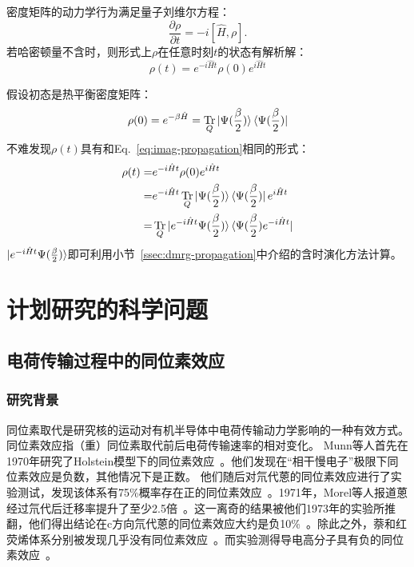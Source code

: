 \documentclass{article}
\DeclareMathOperator{\Tr}{Tr}
\begin{document}
密度矩阵的动力学行为满足量子刘维尔方程：
\begin{equation}
    \frac{\partial \rho}{\partial t} = -i[\hat H, \rho].
\end{equation}
若哈密顿量不含时，则形式上$\rho$在任意时刻$t$的状态有解析解：
\begin{equation}
    \rho(t) = e^{-i \hat H t} \rho(0) e^{i \hat H t}
\end{equation}

假设初态是热平衡密度矩阵：
\begin{equation}
    \rho(0) = e^{- \beta \hat H} = \Tr_Q \ket{\Psi(\frac{\beta}{2})} \bra{\Psi(\frac{\beta}{2})}
\end{equation}
不难发现$\rho(t)$具有和Eq.~\ref{eq:imag-propagation}相同的形式：
\begin{equation}
\begin{aligned}
    \rho(t) = & e^{-i \hat H t} \rho(0) e^{i \hat H t} \\
            = & e^{-i \hat H t} \Tr_Q \ket{\Psi(\frac{\beta}{2})} \bra{\Psi(\frac{\beta}{2})} e^{i \hat H t} \\
            = & \Tr_Q \ket{e^{-i \hat H t} \Psi(\frac{\beta}{2})} \bra{\Psi(\frac{\beta}{2}) e^{-i \hat H t}}
\end{aligned}
\end{equation}
$\ket{e^{-i \hat H t} \Psi(\frac{\beta}{2})}$即可利用小节~\ref{ssec:dmrg-propagation}中介绍的含时演化方法计算。

\section{计划研究的科学问题}
\subsection{电荷传输过程中的同位素效应}
\subsubsection{研究背景}
同位素取代是研究核的运动对有机半导体中电荷传输动力学影响的一种有效方式。同位素效应指（重）同位素取代前后电荷传输速率的相对变化。
Munn等人首先在1970年研究了Holstein模型下的同位素效应~\cite{Munn70}。他们发现在“相干慢电子”极限下同位素效应是负数，其他情况下是正数。
他们随后对氘代蒽的同位素效应进行了实验测试，发现该体系有75\%概率存在正的同位素效应~\cite{Munn70exp}。1971年，Morel等人报道蒽经过氘代后迁移率提升了至少2.5倍~\cite{Morel71}。这一离奇的结果被他们1973年的实验所推翻，他们得出结论在c方向氘代蒽的同位素效应大约是负10\%~\cite{Morel73}。除此之外，萘和红荧烯体系分别被发现几乎没有同位素效应~\cite{SCHEIN79, Xie13}。而实验测得导电高分子具有负的同位素效应~\cite{Shao14}。
\end{document}
